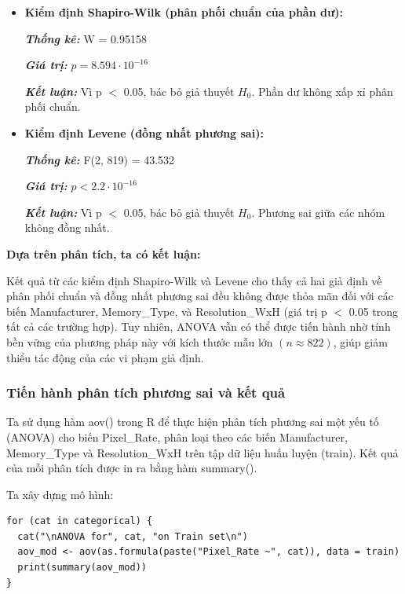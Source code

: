     \begin{itemize}
        \item \textbf{Kiểm định Shapiro-Wilk (phân phối chuẩn của phần dư):}
        
        \textbf{\textit{Thống kê:}} W = 0.95158
        
        \textbf{\textit{Giá trị:}} $p=8.594\cdot{10}^{-16}$
        
        \textbf{\textit{Kết luận:}} Vì p $<$ 0.05, bác bỏ giả thuyết $H_0$. Phần dư không xấp xỉ phân phối chuẩn.
        \item \textbf{Kiểm định Levene (đồng nhất phương sai):}
        
        \textbf{\textit{Thống kê:}} F(2, 819) = 43.532
        
        \textbf{\textit{Giá trị:}} $p<2.2\cdot{10}^{-16}$
        
        \textbf{\textit{Kết luận:}} Vì p $<$ 0.05, bác bỏ giả thuyết $H_0$. Phương sai giữa các nhóm không đồng nhất.
    \end{itemize}

\newpage
\textbf{Dựa trên phân tích, ta có kết luận:}

Kết quả từ các kiểm định Shapiro-Wilk và Levene cho thấy cả hai giả định về phân phối chuẩn và đồng nhất phương sai đều không được thỏa mãn đối với các biến Manufacturer, Memory\_Type, và Resolution\_WxH (giá trị p $<$ 0.05 trong tất cả các trường hợp). Tuy nhiên, ANOVA vẫn có thể được tiến hành nhờ tính bền vững của phương pháp này với kích thước mẫu lớn $(n \approx 822)$, giúp giảm thiểu tác động của các vi phạm giả định.

\subsubsection{Tiến hành phân tích phương sai và kết quả}
Ta sử dụng hàm aov() trong R để thực hiện phân tích phương sai một yếu tố (ANOVA) cho biến Pixel\_Rate, phân loại theo các biến Manufacturer, Memory\_Type và Resolution\_WxH trên tập dữ liệu huấn luyện (train). Kết quả của mỗi phân tích được in ra bằng hàm summary().

Ta xây dựng mô hình:

\begin{verbatim}
for (cat in categorical) {
  cat("\nANOVA for", cat, "on Train set\n")
  aov_mod <- aov(as.formula(paste("Pixel_Rate ~", cat)), data = train)
  print(summary(aov_mod))
}
\end{verbatim}

